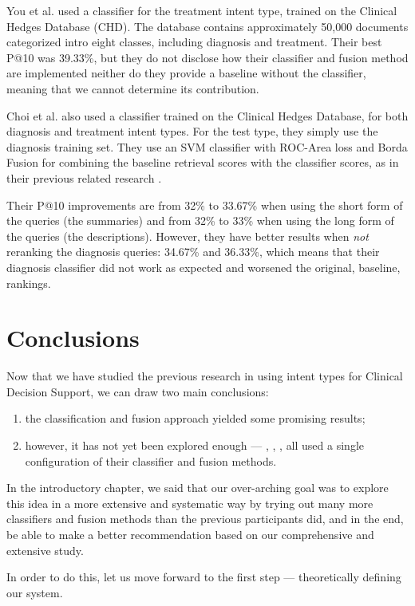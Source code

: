 You et al. \cite{FDUMedSearch} used a classifier for the treatment intent type, trained on the 
Clinical Hedges Database (CHD). The database contains approximately 50,000 documents categorized 
intro eight classes, including diagnosis and treatment. Their best P@10 was 39.33\%, but
they do not disclose how their classifier and fusion method are implemented
neither do they provide a baseline without the classifier, meaning that we cannot determine its contribution.

Choi et al. \cite{choi} also used a classifier trained on the Clinical Hedges Database, for both
diagnosis and treatment intent types. For the test type, they simply use the diagnosis training set.
They use an SVM classifier with ROC-Area loss and Borda Fusion for combining the baseline retrieval 
scores with the classifier scores, as in their previous related research \cite{choi-prev}.

Their P@10 improvements are from 32\% to 33.67\% when using
the short form of the queries (the summaries) and from 32\% to 33\% when using the long form of the queries
(the descriptions). 
However, they have better results when \emph{not} reranking the diagnosis queries: 34.67\% and 36.33\%,
which means that their diagnosis classifier did not work as expected and worsened the original, baseline, rankings.

\section{Conclusions}
Now that we have studied the previous research in 
using intent types for Clinical Decision Support, we can draw two main conclusions:
\begin{enumerate}
 \item the classification and fusion approach yielded some promising results;
 \item however, it has not yet been explored enough --- \cite{choi}, \cite{FDUMedSearch}, \cite{soldani}, \cite{limsi2015}
 all used a single configuration of their classifier and fusion methods.
\end{enumerate}

In the introductory chapter, we said that our over-arching goal was to
explore this idea in a more extensive and systematic way by trying out
many more classifiers and fusion methods than the previous participants did, and in the end,
be able to make a better recommendation based on our comprehensive and extensive study. 

In order to do this, let us move forward to the first step --- theoretically defining our system.


